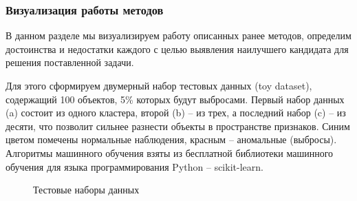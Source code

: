 \documentclass[12pt]{article}
\begin{document}
    \subsubsection{Визуализация работы методов}
    \label{sec:Research:Model:Visualization}

    \par В данном разделе мы визуализируем работу описанных ранее методов, определим достоинства и недостатки каждого с целью выявления наилучшего кандидата для решения поставленной задачи.

    \par Для этого сформируем двумерный набор тестовых данных (toy dataset), содержащий 100 объектов, 5\% которых будут выбросами. Первый набор данных (a) состоит из одного кластера, второй (b) -- из трех, а последний набор (c) -- из десяти, что позволит сильнее разнести объекты в пространстве признаков. Синим цветом помечены нормальные наблюдения, красным -- аномальные (выбросы). Алгоритмы машинного обучения взяты из бесплатной библиотеки машинного обучения для языка программирования Python -- scikit-learn.

    \begin{figure}[h!]
        \centering
        \caption{Тестовые наборы данных}
        \label{sec:Research:Model:Visualization:fig:featueres}
    \end{figure}
\end{document}
